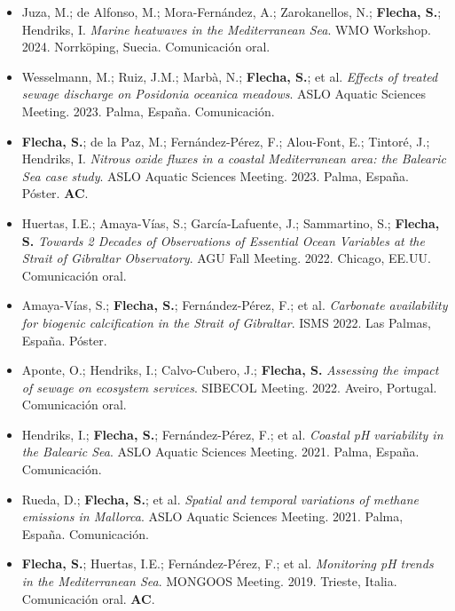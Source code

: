 \documentclass[11pt,a4paper]{article}
\begin{document}
\begin{itemize}[leftmargin=*]
\item[32.] Juza, M.; de Alfonso, M.; Mora-Fernández, A.; Zarokanellos, N.; \textbf{Flecha, S.}; Hendriks, I. 
\textit{Marine heatwaves in the Mediterranean Sea}. 
WMO Workshop. 2024. Norrköping, Suecia. Comunicación oral.

\item[31.] Wesselmann, M.; Ruiz, J.M.; Marbà, N.; \textbf{Flecha, S.}; et al. 
\textit{Effects of treated sewage discharge on Posidonia oceanica meadows}. 
ASLO Aquatic Sciences Meeting. 2023. Palma, España. Comunicación.

\item[30.] \textbf{Flecha, S.}; de la Paz, M.; Fernández-Pérez, F.; Alou-Font, E.; Tintoré, J.; Hendriks, I. 
\textit{Nitrous oxide fluxes in a coastal Mediterranean area: the Balearic Sea case study}. 
ASLO Aquatic Sciences Meeting. 2023. Palma, España. Póster. \textbf{AC}.

\item[29.] Huertas, I.E.; Amaya-Vías, S.; García-Lafuente, J.; Sammartino, S.; \textbf{Flecha, S.} 
\textit{Towards 2 Decades of Observations of Essential Ocean Variables at the Strait of Gibraltar Observatory}. 
AGU Fall Meeting. 2022. Chicago, EE.UU. Comunicación oral.

\item[28.] Amaya-Vías, S.; \textbf{Flecha, S.}; Fernández-Pérez, F.; et al. 
\textit{Carbonate availability for biogenic calcification in the Strait of Gibraltar}. 
ISMS 2022. Las Palmas, España. Póster.

\item[27.] Aponte, O.; Hendriks, I.; Calvo-Cubero, J.; \textbf{Flecha, S.} 
\textit{Assessing the impact of sewage on ecosystem services}. 
SIBECOL Meeting. 2022. Aveiro, Portugal. Comunicación oral.

\item[26.] Hendriks, I.; \textbf{Flecha, S.}; Fernández-Pérez, F.; et al. 
\textit{Coastal pH variability in the Balearic Sea}. 
ASLO Aquatic Sciences Meeting. 2021. Palma, España. Comunicación.

\item[25.] Rueda, D.; \textbf{Flecha, S.}; et al. 
\textit{Spatial and temporal variations of methane emissions in Mallorca}. 
ASLO Aquatic Sciences Meeting. 2021. Palma, España. Comunicación.

\item[24.] \textbf{Flecha, S.}; Huertas, I.E.; Fernández-Pérez, F.; et al. 
\textit{Monitoring pH trends in the Mediterranean Sea}. 
MONGOOS Meeting. 2019. Trieste, Italia. Comunicación oral. \textbf{AC}.


\end{itemize}
\end{document}
